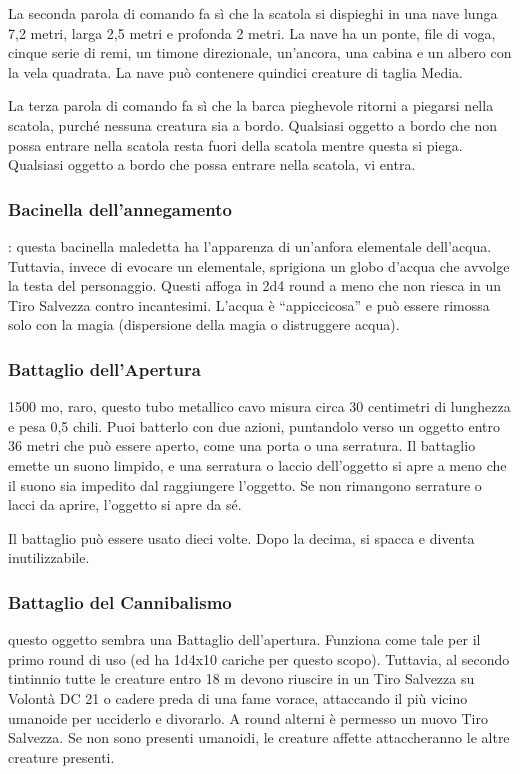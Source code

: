 \begin{multicols}{2}
La seconda parola di comando fa sì che la scatola si dispieghi in una nave lunga 7,2 metri, larga 2,5 metri e profonda 2 metri. La nave ha un ponte, file di voga, cinque serie di remi, un timone direzionale, un'ancora, una cabina e un albero con la vela quadrata. La nave può contenere quindici creature di taglia Media.

La terza parola di comando fa sì che la barca pieghevole ritorni a piegarsi nella scatola, purché nessuna creatura sia a bordo. Qualsiasi oggetto a bordo che non possa entrare nella scatola resta fuori della scatola mentre questa si piega. Qualsiasi oggetto a bordo che possa entrare nella scatola, vi entra.

\subsubsection*{Bacinella dell’annegamento}: questa bacinella maledetta ha l'apparenza di un'anfora elementale dell'acqua. Tuttavia, invece di evocare un elementale, sprigiona un globo d’acqua che avvolge la testa del personaggio. Questi affoga in 2d4 round a meno che non riesca in un Tiro Salvezza contro incantesimi. L'acqua è “appiccicosa” e può essere rimossa solo con la magia (dispersione della magia o distruggere acqua).

\subsubsection*{Battaglio dell'Apertura}
1500 mo, raro, questo tubo metallico cavo misura circa 30 centimetri di lunghezza e pesa 0,5 chili. Puoi batterlo con due azioni, puntandolo verso un oggetto entro 36 metri che può essere aperto, come una porta o una serratura. Il battaglio emette un suono limpido, e una serratura o laccio dell'oggetto si apre a meno che il suono sia impedito dal raggiungere l'oggetto. Se non rimangono serrature o lacci da aprire, l'oggetto si apre da sé.

Il battaglio può essere usato dieci volte. Dopo la decima, si spacca e diventa inutilizzabile.

\subsubsection*{Battaglio del Cannibalismo}
questo oggetto sembra una Battaglio dell'apertura. Funziona come tale per il primo round di uso (ed ha 1d4x10 cariche per questo scopo). Tuttavia, al secondo tintinnio tutte le creature entro 18 m devono riuscire in un Tiro Salvezza su Volontà DC 21 o cadere preda di una fame vorace, attaccando il più vicino umanoide per ucciderlo e divorarlo. A round alterni è permesso un nuovo Tiro Salvezza. Se non sono presenti umanoidi, le creature affette attaccheranno le altre creature presenti.


\end{multicols}
